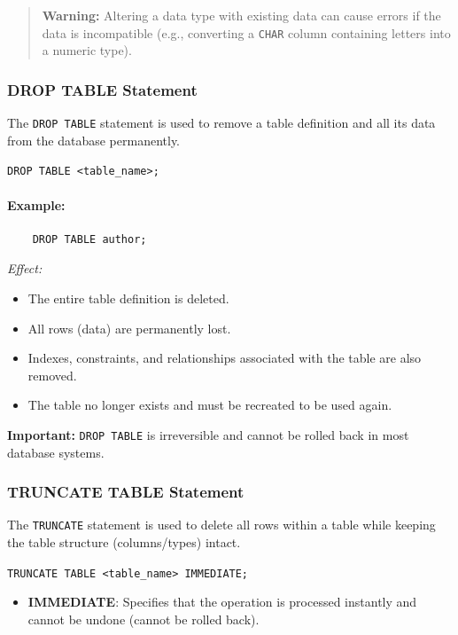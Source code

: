 \documentclass{article}
\begin{document}
\begin{quote}
    \textbf{Warning:} Altering a data type with existing data can cause errors if the data is incompatible (e.g., converting a \texttt{CHAR} column containing letters into a numeric type).
\end{quote}



\subsubsection{DROP TABLE Statement}
The \texttt{DROP TABLE} statement is used to remove a table definition and all its data from the database permanently.

\begin{FormulaBox}
\texttt{DROP TABLE <table\_name>;}
\end{FormulaBox}


\paragraph{Example:}
\begin{verbatim}
    DROP TABLE author;
\end{verbatim}
\textit{Effect:}
\begin{itemize}
    \item The entire table definition is deleted.
    \item All rows (data) are permanently lost.
    \item Indexes, constraints, and relationships associated with the table are also removed.
    \item The table no longer exists and must be recreated to be used again.
\end{itemize}
\textbf{Important:} \texttt{DROP TABLE} is irreversible and cannot be rolled back in most database systems.


\subsubsection{TRUNCATE TABLE Statement}
The \texttt{TRUNCATE} statement is used to delete all rows within a table while keeping the table structure (columns/types) intact. 

\begin{FormulaBox}
\texttt{TRUNCATE TABLE <table\_name> IMMEDIATE;}
\end{FormulaBox}

\begin{itemize}
    \item \textbf{IMMEDIATE}: Specifies that the operation is processed instantly and cannot be undone (cannot be rolled back).
\end{itemize}
\end{document}
